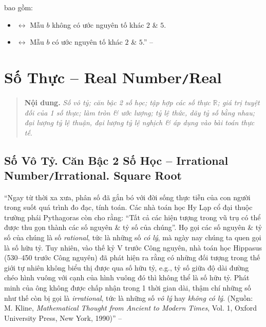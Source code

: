 \documentclass[oneside]{book}
\numberwithin{equation}{section}
\begin{document}
 bao gồm:
\begin{itemize}
	\item {} $\leftrightarrow$ Mẫu $b$ không có ước nguyên tố khác $2$ \& $5$.
	\item {} $\leftrightarrow$ Mẫu $b$ có ước nguyên tố khác $2$ \& $5$.'' -- \cite[p. 29]{SGK_Toan_7_Canh_Dieu_tap_1}
\end{itemize}


\chapter{Số Thực -- Real Number\texttt{/}Real}

\begin{quotation}
	\textbf{Nội dung.} \textit{Số vô tỷ; căn bậc 2 số học; tập hợp các số thực $\mathbb{R}$; giá trị tuyệt đối của 1 số thực; làm tròn \& ước lượng; tỷ lệ thức, dãy tỷ số bằng nhau; đại lượng tỷ lệ thuận, đại lượng tỷ lệ nghịch \& áp dụng vào bài toán thực tế}.
\end{quotation}

\section{Số Vô Tỷ. Căn Bậc 2 Số Học -- Irrational Number\texttt{/}Irrational. Square Root}
``Ngay từ thời xa xưa, phân số đã gắn bó với đời sống thực tiễn của con người trong suốt quá trình đo đạc, tính toán. Các nhà toán học Hy Lạp cổ đại thuộc trường phái Pythagoras còn cho rằng: ``Tất cả các hiện tượng trong vũ trụ có thể được thu gọn thành các số nguyên \& tỷ số của chúng''. Họ gọi các số nguyên \& tỷ số của chúng là số \textit{rational}, tức là những số \textit{có lý}, mà ngày nay chúng ta quen gọi là số hữu tỷ. Tuy nhiên, vào thế kỷ V trước Công nguyên, nhà toán học Hippasus (530--450 trước Công nguyên) đã phát hiện ra rằng có những đối tượng trong thế giới tự nhiên không biểu thị được qua số hữu tỷ, e.g., tỷ số giữa độ dài đường chéo hình vuông với cạnh của hình vuông đó thì không thể là số hữu tỷ. Phát minh của ông không được chấp nhận trong 1 thời gian dài, thậm chí những số như thế còn bị gọi là \textit{irrational}, tức là những số \textit{vô lý} hay \textit{không có lý}. (Nguồn: M. Kline, \textit{Mathematical Thought from Ancient to Modern Times}, Vol. 1, Oxford University Press, New York, 1990)''  -- \cite[p. 32]{SGK_Toan_7_Canh_Dieu_tap_1}
\end{document}

